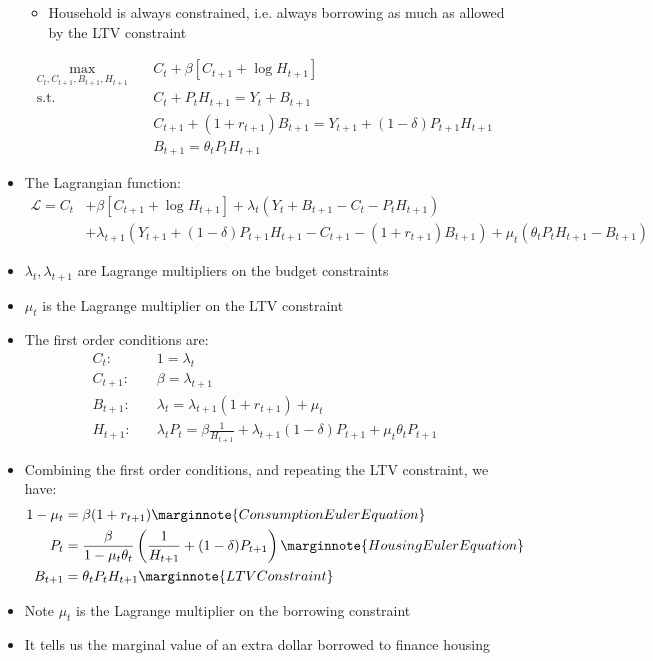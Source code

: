 \documentclass[a4paper]{article}
\begin{document}
\begin{itemize}
\begin{itemize}
			\item Household is always constrained, i.e. always borrowing as much as allowed by the LTV constraint
		\end{itemize}
		\begin{align*}
			\max_{C_t,C_{t+1},B_{t+1},H_{t+1}}\quad &C_t + \beta[C_{t+1} + \log H_{t+1}]\\
			\text{s.t.}\quad &C_t + P_t H_{t+1} = Y_t + B_{t+1}\\
			&C_{t+1} + (1+r_{t+1})B_{t+1} = Y_{t+1} + (1-\delta)P_{t+1}H_{t+1}\\
			&B_{t+1} = \theta_tP_tH_{t+1}
		\end{align*}
		\item The Lagrangian function:
		\begin{align*}
			\mathcal{L} = C_t &+ \beta[C_{t+1} + \log H_{t+1}] + \lambda_t(Y_t + B_{t+1} - C_t - P_t H_{t+1})\\ 
			&+ \lambda_{t+1}(Y_{t+1} + (1-\delta)P_{t+1}H_{t+1} - C_{t+1} - (1+r_{t+1})B_{t+1}) + \mu_t(\theta_tP_tH_{t+1} - B_{t+1})
		\end{align*}
		\item \( \lambda_t,\lambda_{t+1} \) are Lagrange multipliers on the budget constraints
		\item \( \mu_t \) is the Lagrange multiplier on the LTV constraint
		\item The first order conditions are:
		\begin{align*}
			C_t:& \quad1=\lambda_t\\
			C_{t+1}:& \quad\beta=\lambda_{t+1}\\
			B_{t+1}:& \quad\lambda_t=\lambda_{t+1}(1+r_{t+1})+\mu_t\\
			H_{t+1}:& \quad\lambda_tP_t=\beta\frac{1}{H_{t+1}}+\lambda_{t+1}(1-\delta)P_{t+1}+\mu_t\theta_tP_{t+1}
		\end{align*}
		\item Combining the first order conditions, and repeating the LTV constraint, we have:
		\begin{align*}
			1-\mu_t&=\beta(1+r_{t+1}) \marginnote{Consumption Euler Equation}\\
			P_t&=\frac{\beta}{1-\mu_t\theta_t}\left( \frac{1}{H_{t+1}} + (1-\delta)P_{t+1} \right)\marginnote{Housing Euler Equation}\\
			B_{t+1}&=\theta_tP_tH_{t+1} \marginnote{LTV Constraint}
		\end{align*}
		\item Note \( \mu_t \) is the Lagrange multiplier on the borrowing constraint
		\item It tells us the marginal value of an extra dollar borrowed to finance housing
	\end{itemize}
\end{document}
